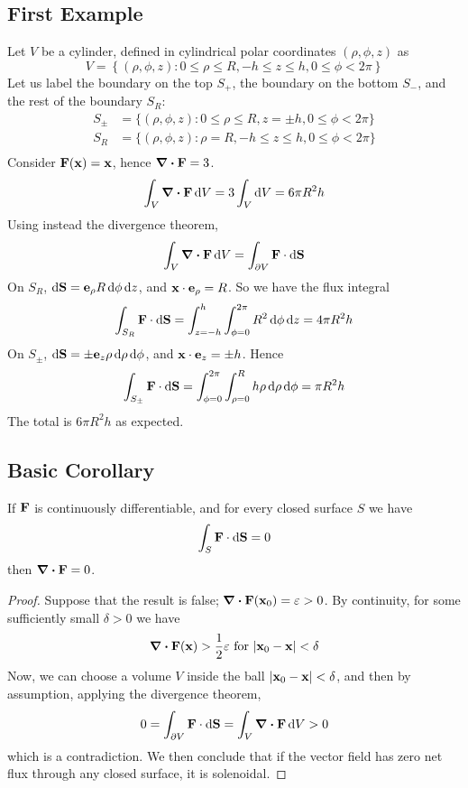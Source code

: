 \documentclass{article}
\begin{document}
\subsection{First Example}
Let $V$ be a cylinder, defined in cylindrical polar coordinates $(\rho, \phi, z)$ as
\[ V = \left\{ (\rho, \phi, z) \colon 0 \leq \rho \leq R, -h \leq z \leq h, 0 \leq \phi < 2 \pi \right\} \]
Let us label the boundary on the top $S_+$, the boundary on the bottom $S_-$, and the rest of the boundary $S_R$:
\begin{align*}
    S_\pm & = \{ (\rho, \phi, z) \colon 0 \leq \rho \leq R, z = \pm h, 0 \leq \phi < 2 \pi \} \\
    S_R   & = \{ (\rho, \phi, z) \colon \rho = R, -h \leq z \leq h, 0 \leq \phi < 2 \pi \}    \\
\end{align*}
Consider $\vb F(\vb x) = \vb x$, hence $\div{\vb F} = 3$.
\[ \int_V \div{\vb F} \dd{V} = 3 \int_V \dd{V} = 6\pi R^2 h \]
Using instead the divergence theorem,
\[ \int_V \div{\vb F} \dd{V} = \int_{\partial V} \vb F \cdot \dd{\vb S} \]
On $S_R$, $\dd{\vb S} = \vb e_\rho R \dd{\phi}\dd{z}$, and $\vb x \cdot \vb e_\rho = R$. So we have the flux integral
\[ \int_{S_R} \vb F \cdot \dd{\vb S} = \int_{z = -h}^h \int_{\phi = 0}^{2 \pi} R^2 \dd{\phi} \dd{z} = 4\pi R^2 h \]
On $S_\pm$, $\dd{\vb S} = \pm \vb e_z \rho \dd{\rho}\dd{\phi}$, and $\vb x \cdot \vb e_z = \pm h$. Hence
\[ \int_{S_\pm} \vb F \cdot \dd{\vb S} = \int_{\phi = 0}^{2 \pi} \int_{\rho = 0}^R h \rho\dd{\rho}\dd{\phi} = \pi R^2 h \]
The total is $6\pi R^2 h$ as expected.

\subsection{Basic Corollary}
\begin{proposition}
    If $\vb F$ is continuously differentiable, and for every closed surface $S$ we have
    \[ \int_S \vb F \cdot \dd{\vb S} = 0 \]
    then $\div{\vb F} = 0$.
\end{proposition}
\begin{proof}
    Suppose that the result is false; $\div{\vb F}(\vb x_0) = \varepsilon > 0$. By continuity, for some sufficiently small $\delta > 0$ we have
    \[ \div{\vb F}(\vb x) > \frac{1}{2} \varepsilon \text{ for } \abs{\vb x_0 - \vb x} < \delta \]
    Now, we can choose a volume $V$ inside the ball $\abs{\vb x_0 - \vb x} < \delta$, and then by assumption, applying the divergence theorem,
    \[ 0 = \int_{\partial V} \vb F \cdot \dd{\vb S} = \int_V \div{\vb F} \dd{V} > 0 \]
    which is a contradiction. We then conclude that if the vector field has zero net flux through any closed surface, it is solenoidal.
\end{proof}
\end{document}
